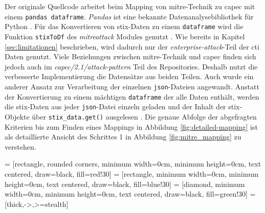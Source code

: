 Der originale Quellcode arbeitet beim Mapping von \gls{mitre}-Technik zu \gls{capec} mit einem \verb|pandas dataframe|. \textit{Pandas} ist eine bekannte Datenanalysebibliothek für Python \autocite{PandasPythonData}. Für das Konvertieren von \gls{stix}-Daten zu einem \verb|dataframe| wird die Funktion \verb|stixToDf| des \textit{mitreattack} Modules genutzt \autocite{MitreattackpythonMitreattackAttackToExcel}. Wie bereits in Kapitel \ref{sec:limitationen} beschrieben, wird dadurch nur der \textit{enterprise-attack}-Teil der \gls{cti} Daten genutzt. Viele Beziehungen zwischen \gls{mitre}-Technik und \gls{capec} finden sich jedoch auch im \textit{capec/2.1/attack-pattern} Teil des Repositories. Deshalb nutzt die verbesserte Implementierung die Datensätze aus beiden Teilen. Auch wurde ein anderer Ansatz zur Verarbeitung der einzelnen \verb|json|-Dateien angewandt. Anstatt der Konvertierung zu einem mächtigen \verb|dataframe| der alle Daten enthält, werden die \gls{stix}-Daten aus jeder \verb|json|-Datei einzeln geladen und der Inhalt der \gls{stix}-Objekte über \verb|stix_data.get()| ausgelesen \autocite{OasisopenCtipythonstix2OASIS}. Die genaue Abfolge der abgefragten Kriterien bis zum Finden eines Mappings in Abbildung \ref{fig:detailed-mapping} ist als detaillierte Ansicht des Schrittes 1 in Abbildung \ref{fig:mitre_mapping} zu verstehen.

\usetikzlibrary{shapes.geometric, arrows}

 = [rectangle, rounded corners, minimum width=0cm, minimum height=0cm, text centered, draw=black, fill=red!30]
 = [rectangle, minimum width=0cm, minimum height=0cm, text centered, draw=black, fill=blue!30]
 = [diamond, minimum width=0cm, minimum height=0cm, text centered, draw=black, fill=green!30]
 = [thick,->,>=stealth]


